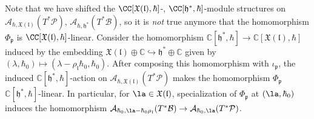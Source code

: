 \documentclass[12pt]{amsart}
\begin{document}
\begin{warning}\label{warning_shift}
Note that we have shifted the $\CC[\mathfrak{X}(\mathfrak{l}),\hbar]$-, $\CC[\mathfrak{h}^*,\hbar]$-module structures on $\mathcal{A}_{\hbar,\mathfrak{X}(\mathfrak{l})}(T^*\mathcal{P})$, $\mathcal{A}_{\hbar,\mathfrak{h}^*}(T^*\mathcal{B})$, so it is {\emph{not}} true anymore that the homomorphism $\Phi_{\mathfrak{p}}$ is $\CC[\mathfrak{X}(\mathfrak{l}),\hbar]$-linear. Consider the homomorphism $\mathbb{C}[\mathfrak{h}^*,\hbar] \rightarrow \mathbb{C}[\mathfrak{X}(\mathfrak{l}),\hbar]$ induced by the embedding $\mathfrak{X}(\mathfrak{l}) \oplus \mathbb{C} \hookrightarrow \mathfrak{h}^* \oplus \mathbb{C}$ given by $(\lambda,\hbar_0) \mapsto (\lambda-\rho_{\mathfrak{l}}\hbar_0,\hbar_0)$.  
After composing this homomorphism with $\iota_{\mathfrak{p}}$, the induced $\mathbb{C}[\mathfrak{h}^*,\hbar]$-action on $\mathcal{A}_{\hbar,\mathfrak{X}(\mathfrak{l})}(T^*\mathcal{P})$ makes the homomorphism $\Phi_{\mathfrak{p}}$ $\mathbb{C}[\mathfrak{h}^*,\hbar]$-linear.
In particular, for $\la \in \mathfrak{X}(\mathfrak{l})$, specialization of $\Phi_{\mathfrak{p}}$ at $(\la, \hbar_0)$ induces the homomorphism  $\mathcal{A}_{\hbar_0,\la-\hbar_0\rho_{{\mathfrak{l}}}}(T^*\mathcal{B}) \rightarrow \mathcal{A}_{\hbar_0,\la}(T^*\mathcal{P})$.
\end{warning}




\end{document}
